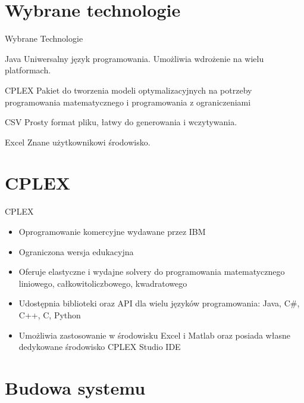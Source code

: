 \documentclass{beamer}
\begin{document}
\section{Wybrane technologie}

\begin{frame}{Wybrane Technologie}

\begin{block}{Java}
Uniwersalny język programowania. Umożliwia wdrożenie na wielu platformach.
\end{block}
\begin{block}{CPLEX}
Pakiet do tworzenia modeli optymalizacyjnych na potrzeby programowania matematycznego i programowania z ograniczeniami
\end{block}
\begin{block}{CSV}
Prosty format pliku, łatwy do generowania i wczytywania.
\end{block}
\begin{block}{Excel}
Znane użytkownikowi środowisko.
\end{block}

\end{frame}

\section{CPLEX}

\begin{frame}{CPLEX}
\begin{itemize}
\item{Oprogramowanie komercyjne wydawane przez IBM}
\item{Ograniczona wersja edukacyjna}
\item{Oferuje elastyczne i wydajne solvery do programowania matematycznego liniowego, całkowitoliczbowego, kwadratowego}
\item{Udostępnia biblioteki oraz API dla wielu języków programowania: Java, C\#, C++, C, Python}
\item{Umożliwia zastosowanie w środowisku Excel i Matlab oraz posiada własne dedykowane środowisko CPLEX Studio IDE}

\end{itemize}

\end{frame}


\section{Budowa systemu}
\end{document}
